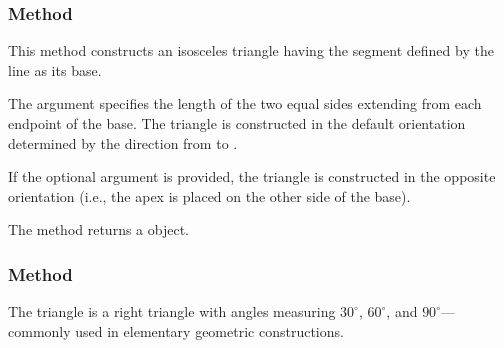 \subsubsection{Method }
\label{ssub:method_line_isosceles}

This method constructs an isosceles triangle having the segment defined by the line as its base.

\medskip
The argument  specifies the length of the two equal sides extending from each endpoint of the base. The triangle is constructed in the default orientation determined by the direction from  to .

\medskip

If the optional argument  is provided, the triangle is constructed in the opposite orientation (i.e., the apex is placed on the other side of the base).

\medskip

The method returns a  object.

\vspace{1em}
\begin{minipage}{.5\textwidth}
\begin{center}
\end{center}
\end{minipage}
\begin{minipage}{.5\textwidth}
\begin{tkzexample}
\end{tkzexample}
\end{minipage}

\subsubsection{Method }
\label{ssub:method_imeth_line_school_swap}
The  triangle is a right triangle with angles measuring $30^\circ$, $60^\circ$, and $90^\circ$—commonly used in elementary geometric constructions.

